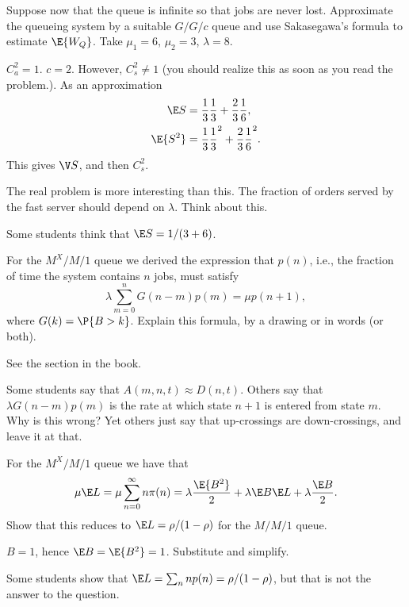 \begin{exercise}[201904]
 Suppose now that the queue is infinite so that jobs are never lost.
 Approximate the queueing system by a suitable $G/G/c$ queue and use Sakasegawa's formula to estimate $\E{W_Q}$.
 Take $\mu_1=6$, $\mu_2=3$, $\lambda=8$.
\begin{solution}
 $C_a^2=1$. $c=2$. However, $C_s^2\neq 1$ (you should realize this as soon as you read the problem.). As an approximation
 \begin{align*}
 \E S &= \frac 1 3 \frac 1 3 + \frac 2 3 \frac 1 6, \\
 \E{S^2} &= \frac 1 3 \frac 1 3^2 + \frac 2 3 \frac 1 6^2.
 \end{align*}
 This gives $\V S$, and then $C_s^2$.

 The real problem is more interesting than this.
 The fraction of orders served by the fast server should depend on $\lambda$.
 Think about this.

 Some students think that $\E S = 1/(3+6)$. 
\end{solution}
\end{exercise}



\begin{exercise}[201904]
 For the $M^X/M/1$ queue we derived the expression that $p(n)$, i.e., the fraction of time the system contains $n$ jobs, must satisfy
 \begin{equation}
 \lambda \sum_{m=0}^n G(n-m) p(m) = \mu p(n+1), 
 \end{equation}
 where $G(k) = \P{B>k}$.
 Explain this formula, by a drawing or in words (or both).

\begin{solution}
 See the section in the book.

 Some students say that $A(m,n,t) \approx D(n,t)$.
 Others say that $\lambda G(n-m)p(m)$ is the rate at which state $n+1$ is entered from state $m$.
 Why is this wrong?
 Yet others just say that up-crossings are down-crossings, and leave it at that.
\end{solution}

\end{exercise}



\begin{exercise}[201904]
For the $M^X/M/1$ queue we have that
\begin{equation}
 \mu \E L =\mu \sum_{n=0}^\infty n \pi(n) = \lambda \frac{\E{B^2}}2 + \lambda \E B \E L +\lambda \frac{\E B}2.
\end{equation}
Show that this reduces to $\E L = \rho/(1-\rho)$ for the $M/M/1$ queue.
\begin{solution}
 $B=1$, hence $\E B = \E{B^2} = 1$. Substitute and simplify.

 Some students show that $\E L = \sum_n np(n)=\rho/(1-\rho)$, but that is not the answer to the question.
\end{solution}
\end{exercise}


